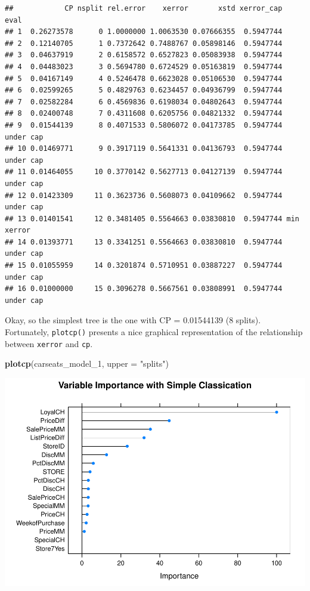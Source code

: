 \documentclass[
]{book}
\newenvironment{Shaded}{\begin{snugshade}}{\end{snugshade}}
\newcommand{\DataTypeTok}[1]{\textcolor[rgb]{0.13,0.29,0.53}{#1}}
\newcommand{\DecValTok}[1]{\textcolor[rgb]{0.00,0.00,0.81}{#1}}
\newcommand{\KeywordTok}[1]{\textcolor[rgb]{0.13,0.29,0.53}{\textbf{#1}}}
\newcommand{\NormalTok}[1]{#1}
\newcommand{\StringTok}[1]{\textcolor[rgb]{0.31,0.60,0.02}{#1}}
\begin{document}
\begin{verbatim}
##            CP nsplit rel.error    xerror       xstd xerror_cap       eval
## 1  0.26273578      0 1.0000000 1.0063530 0.07666355  0.5947744           
## 2  0.12140705      1 0.7372642 0.7488767 0.05898146  0.5947744           
## 3  0.04637919      2 0.6158572 0.6527823 0.05083938  0.5947744           
## 4  0.04483023      3 0.5694780 0.6724529 0.05163819  0.5947744           
## 5  0.04167149      4 0.5246478 0.6623028 0.05106530  0.5947744           
## 6  0.02599265      5 0.4829763 0.6234457 0.04936799  0.5947744           
## 7  0.02582284      6 0.4569836 0.6198034 0.04802643  0.5947744           
## 8  0.02400748      7 0.4311608 0.6205756 0.04821332  0.5947744           
## 9  0.01544139      8 0.4071533 0.5806072 0.04173785  0.5947744  under cap
## 10 0.01469771      9 0.3917119 0.5641331 0.04136793  0.5947744  under cap
## 11 0.01464055     10 0.3770142 0.5627713 0.04127139  0.5947744  under cap
## 12 0.01423309     11 0.3623736 0.5608073 0.04109662  0.5947744  under cap
## 13 0.01401541     12 0.3481405 0.5564663 0.03830810  0.5947744 min xerror
## 14 0.01393771     13 0.3341251 0.5564663 0.03830810  0.5947744  under cap
## 15 0.01055959     14 0.3201874 0.5710951 0.03887227  0.5947744  under cap
## 16 0.01000000     15 0.3096278 0.5667561 0.03808991  0.5947744  under cap
\end{verbatim}

Okay, so the simplest tree is the one with CP = 0.01544139 (8 splits). Fortunately, \texttt{plotcp()} presents a nice graphical representation of the relationship between \texttt{xerror} and \texttt{cp}.

\begin{Shaded}
\begin{Highlighting}[]
\KeywordTok{plotcp}\NormalTok{(carseats_model_}\DecValTok{1}\NormalTok{, }\DataTypeTok{upper =} \StringTok{"splits"}\NormalTok{)}
\end{Highlighting}
\end{Shaded}

\includegraphics{data-sci_files/figure-latex/unnamed-chunk-91-1.pdf}
\end{document}
